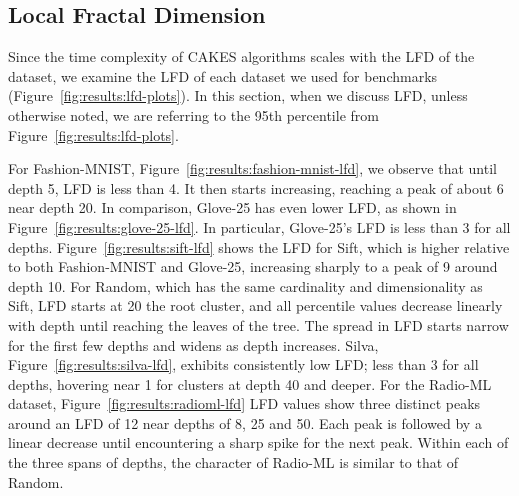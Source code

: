 \subsection{Local Fractal Dimension}
\label{sec:dayasets:lfd-of-datasets}

Since the time complexity of CAKES algorithms scales with the LFD of the dataset, we examine the LFD of each dataset we used for benchmarks (Figure~\ref{fig:results:lfd-plots}).
In this section, when we discuss LFD, unless otherwise noted, we are referring to the 95th percentile from Figure~\ref{fig:results:lfd-plots}.

For Fashion-MNIST, Figure~\ref{fig:results:fashion-mnist-lfd}, we observe that until depth 5, LFD is less than 4. 
It then starts increasing, reaching a peak of about 6 near depth 20.
In comparison, Glove-25 has even lower LFD, as shown in Figure~\ref{fig:results:glove-25-lfd}. 
In particular, Glove-25's LFD is less than 3 for all depths.
Figure~\ref{fig:results:sift-lfd} shows the LFD for Sift, which is higher relative to both Fashion-MNIST and Glove-25, increasing sharply to a peak of 9 around depth 10.
For Random, which has the same cardinality and dimensionality as Sift, LFD starts at 20 the root cluster, and all percentile values decrease linearly with depth until reaching the leaves of the tree.
The spread in LFD starts narrow for the first few depths and widens as depth increases.
Silva, Figure~\ref{fig:results:silva-lfd}, exhibits consistently low LFD;
less than 3 for all depths, hovering near 1 for clusters at depth 40 and deeper.
For the Radio-ML dataset, Figure~\ref{fig:results:radioml-lfd} LFD values show three distinct peaks around an LFD of 12 near depths of 8, 25 and 50.
Each peak is followed by a linear decrease until encountering a sharp spike for the next peak.
Within each of the three spans of depths, the character of Radio-ML is similar to that of Random.

